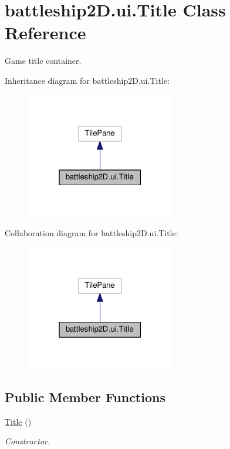 \hypertarget{classbattleship2D_1_1ui_1_1Title}{\section{battleship2\-D.\-ui.\-Title Class Reference}
\label{classbattleship2D_1_1ui_1_1Title}
}


Game title container.  




Inheritance diagram for battleship2\-D.\-ui.\-Title\-:\nopagebreak
\begin{figure}[H]
\begin{center}
\leavevmode
\includegraphics[width=184pt]{classbattleship2D_1_1ui_1_1Title__inherit__graph}
\end{center}
\end{figure}


Collaboration diagram for battleship2\-D.\-ui.\-Title\-:\nopagebreak
\begin{figure}[H]
\begin{center}
\leavevmode
\includegraphics[width=184pt]{classbattleship2D_1_1ui_1_1Title__coll__graph}
\end{center}
\end{figure}
\subsection*{Public Member Functions}
\begin{DoxyCompactItemize}
\item 
\hyperlink{classbattleship2D_1_1ui_1_1Title_a920069b7b3d283872643b571a55447b3}{Title} ()
\begin{DoxyCompactList}\small\item\em Constructor. \end{DoxyCompactList}\end{DoxyCompactItemize}
